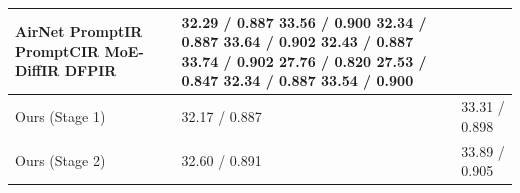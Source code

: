 \begin{tabular}{lll}
\toprule
AirNet PromptIR PromptCIR MoE-DiffIR DFPIR & 32.29 / 0.887 33.56 / 0.900 32.34 / 0.887 33.64 / 0.902 32.43 / 0.887 33.74 / 0.902 27.76 / 0.820 27.53 / 0.847 32.34 / 0.887 33.54 / 0.900 &  \\
\midrule
Ours (Stage 1) & 32.17 / 0.887 & 33.31 / 0.898 \\
Ours (Stage 2) & 32.60 / 0.891 & 33.89 / 0.905 \\
\bottomrule
\end{tabular}
